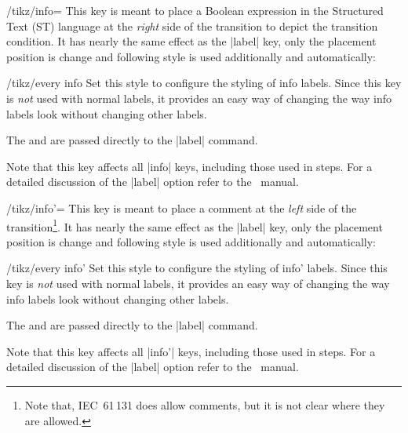 \documentclass[a4paper]{ltxdoc}
\begin{document}
\begin{key}{/tikz/info=}
  This key is meant to place a Boolean expression in the Structured Text (ST) language at the \emph{right} side of the transition to depict the transition condition. It has nearly the same effect as the |label| key, only the placement position is change and following style is used additionally and automatically:
  \begin{stylekey}{/tikz/every info}
    Set this style to configure the styling of info labels. Since this
    key is \emph{not} used with normal labels, it provides an easy way
    of changing the way info labels look without changing other
    labels.
  \end{stylekey}
  The  and  are passed directly to the |label| command.
\begin{codeexample}[width=3.4cm]
\end{codeexample}
  Note that this key affects all |info| keys, including those used in steps. For a detailed discussion of the |label| option refer to the \tikzname\ manual.
\end{key}

\begin{key}{/tikz/info'=}
  This key is meant to place a comment at the \emph{left} side of the transition\footnote{Note that, IEC~61\,131 does allow comments, but it is not clear where they are allowed.}. It has nearly the same effect as the |label| key, only the placement position is change and following style is used additionally and automatically:
  \begin{stylekey}{/tikz/every info'}
    Set this style to configure the styling of info' labels. Since this
    key is \emph{not} used with normal labels, it provides an easy way
    of changing the way info labels look without changing other
    labels.
  \end{stylekey}
  The  and  are passed directly to the |label| command.
\begin{codeexample}[width=5cm]
\end{codeexample}
  Note that this key affects all |info'| keys, including those used in steps. For a detailed discussion of the |label| option refer to the \tikzname\ manual.
\end{key}
\end{document}
